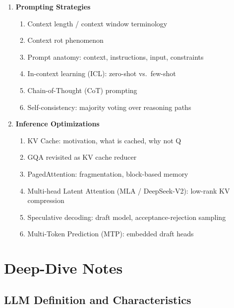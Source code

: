 \documentclass[11pt, a4paper]{article}
\begin{document}
\begin{enumerate}[label=\textbf{\arabic*.}, leftmargin=2em]
  \item \textbf{Prompting Strategies}
    \begin{enumerate}[label=\arabic{enumi}.\arabic*]
      \item Context length / context window terminology
      \item Context rot phenomenon
      \item Prompt anatomy: context, instructions, input, constraints
      \item In-context learning (ICL): zero-shot vs.\ few-shot
      \item Chain-of-Thought (CoT) prompting
      \item Self-consistency: majority voting over reasoning paths
    \end{enumerate}

  \item \textbf{Inference Optimizations}
    \begin{enumerate}[label=\arabic{enumi}.\arabic*]
      \item KV Cache: motivation, what is cached, why not Q
      \item GQA revisited as KV cache reducer
      \item PagedAttention: fragmentation, block-based memory
      \item Multi-head Latent Attention (MLA / DeepSeek-V2): low-rank KV compression
      \item Speculative decoding: draft model, acceptance-rejection sampling
      \item Multi-Token Prediction (MTP): embedded draft heads
    \end{enumerate}
\end{enumerate}

\newpage
\section{Deep-Dive Notes}

\subsection{LLM Definition and Characteristics}
\end{document}
